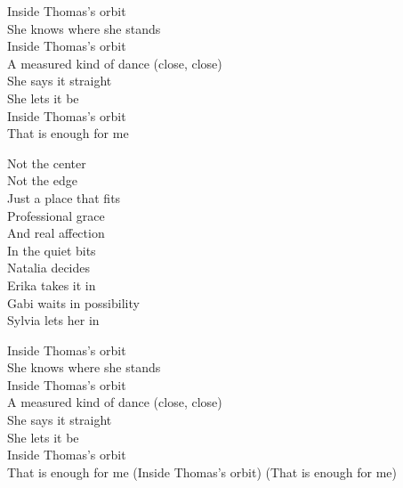 \begin{lyrics}
Inside Thomas's orbit\\
She knows where she stands\\
Inside Thomas's orbit\\
A measured kind of dance
(close, close)\\
She says it straight\\
She lets it be\\
Inside Thomas's orbit\\
That is enough for me

Not the center\\
Not the edge\\
Just a place that fits\\
Professional grace\\
And real affection\\
In the quiet bits\\
Natalia decides\\
Erika takes it in\\
Gabi waits in possibility\\
Sylvia lets her in

Inside Thomas's orbit\\
She knows where she stands\\
Inside Thomas's orbit\\
A measured kind of dance
(close, close)\\
She says it straight\\
She lets it be\\
Inside Thomas's orbit\\
That is enough for me
(Inside Thomas's orbit)
(That is enough for me)
\end{lyrics}

